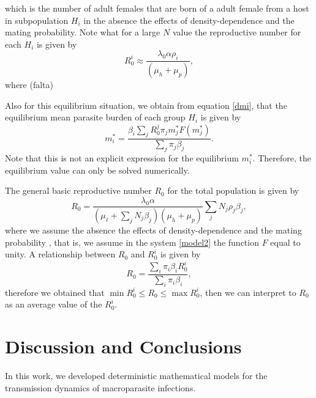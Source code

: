 \documentclass[eng]{MMSB-class-eng}
\begin{document}
{\begin{equation}
\end{equation}
which is the number of adult females that are born of a adult female from a host in subpopulation $H_i$ in the absence the effects of density-dependence and the mating probability. Note what for a large $N$ value the reproductive number for each $H_i$ is given by
%
%
\begin{equation}
R_0^i\approx \frac{ \lambda_0 \alpha  \rho_i }{ (\mu_h + \mu_p) },  
\end{equation}
where (falta)

Also for this equilibrium situation, we obtain from equation \eqref{dmi}, that the equilibrium mean parasite burden of each group $H_{i}$ is given by
\begin{equation}
m_{i}^*=\frac{\beta_{i}\sum_jR_0^j\pi_jm_j^* F(m_j^*)}{ \sum_j \pi_j\beta_{j}}.
\end{equation}
Note that this is not an explicit expression for the equilibrium $m_{i}^*$. Therefore, the equilibrium value can only be solved numerically.
}

The general basic reproductive number $R_0$ for the total population is given by %
\begin{equation}\label{valorR0}
R_{0}=\frac{\lambda_0 \alpha }
{ (\mu_{\ell}+\sum_j N_j \beta_j  )(\mu_{h}+\mu_p)}
\sum_j N_j \rho_{j} \beta_{j},   
\end{equation}
where we assume the absence the effects of density-dependence and the mating probability \citep{anderson1992infectious}, that is, we assume in the system \eqref{model2} the function $F$ equal to unity.
A relationship between $R_0$ and $R_0^i$ is given by
\begin{equation}
R_{0}=\frac{\sum_i \pi_i\beta_{i}R_0^i}
{\sum_i \pi_i \beta_{i}},   
\end{equation}
therefore we obtained that $\min R_0^i\leq R_0 \leq \max R_0^i$, 
then we can interpret to $R_0$ as an average value of the $R_0^i$.


\section{Discussion and Conclusions}

In this work, we developed deterministic mathematical models for the transmission dynamics of macroparasite infections. 
\end{document}
